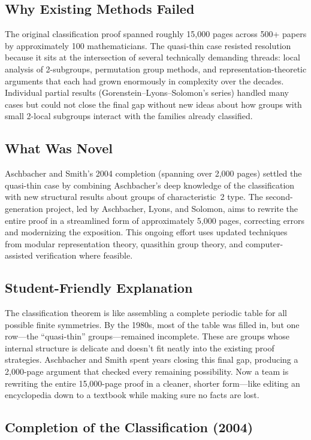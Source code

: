 \subsection{Why Existing Methods Failed}
The original classification proof spanned roughly 15,000 pages across 500+ papers by approximately 100 mathematicians. The quasi-thin case resisted resolution because it sits at the intersection of several technically demanding threads: local analysis of 2-subgroups, permutation group methods, and representation-theoretic arguments that each had grown enormously in complexity over the decades. Individual partial results (Gorenstein--Lyons--Solomon's series) handled many cases but could not close the final gap without new ideas about how groups with small 2-local subgroups interact with the families already classified.

\subsection{What Was Novel}
Aschbacher and Smith's 2004 completion (spanning over 2,000 pages) settled the quasi-thin case by combining Aschbacher's deep knowledge of the classification with new structural results about groups of characteristic~2 type. The second-generation project, led by Aschbacher, Lyons, and Solomon, aims to rewrite the entire proof in a streamlined form of approximately 5,000 pages, correcting errors and modernizing the exposition. This ongoing effort uses updated techniques from modular representation theory, quasithin group theory, and computer-assisted verification where feasible.

\subsection{Student-Friendly Explanation}
The classification theorem is like assembling a complete periodic table for all possible finite symmetries. By the 1980s, most of the table was filled in, but one row---the ``quasi-thin'' groups---remained incomplete. These are groups whose internal structure is delicate and doesn't fit neatly into the existing proof strategies. Aschbacher and Smith spent years closing this final gap, producing a 2,000-page argument that checked every remaining possibility. Now a team is rewriting the entire 15,000-page proof in a cleaner, shorter form---like editing an encyclopedia down to a textbook while making sure no facts are lost.

\subsection{Completion of the Classification (2004)}

